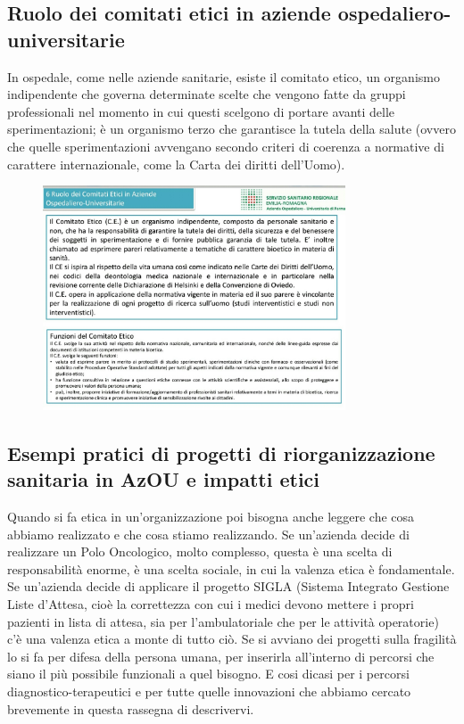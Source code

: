 \subsection{Ruolo dei comitati etici in aziende ospedaliero-universitarie}

In ospedale, come nelle aziende sanitarie, esiste il comitato etico, un
organismo indipendente che governa determinate scelte che vengono fatte
da gruppi professionali nel momento in cui questi scelgono di portare
avanti delle sperimentazioni; è un organismo terzo che garantisce la
tutela della salute (ovvero che quelle sperimentazioni avvengano secondo
criteri di coerenza a normative di carattere internazionale, come la
Carta dei diritti dell'Uomo).

 \begin{figure}[!ht]
\centering
	\includegraphics[width=0.8\textwidth]{32/image22.jpeg}
	\end{figure}

\subsection{Esempi pratici di progetti di riorganizzazione sanitaria in AzOU e impatti etici}

Quando si fa etica in un'organizzazione poi bisogna anche leggere che
cosa abbiamo realizzato e che cosa stiamo realizzando. Se un'azienda
decide di realizzare un Polo Oncologico, molto complesso, questa è una
scelta di responsabilità enorme, è una scelta sociale, in cui la valenza
etica è fondamentale. Se un'azienda decide di applicare il progetto
SIGLA (Sistema Integrato Gestione Liste d'Attesa, cioè la correttezza
con cui i medici devono mettere i propri pazienti in lista di attesa,
sia per l'ambulatoriale che per le attività operatorie) c'è una valenza
etica a monte di tutto ciò. Se si avviano dei progetti sulla fragilità
lo si fa per difesa della persona umana, per inserirla all'interno di
percorsi che siano il più possibile funzionali a quel bisogno. E cosi
dicasi per i percorsi diagnostico-terapeutici e per tutte quelle
innovazioni che abbiamo cercato brevemente in questa rassegna di
descrivervi.


